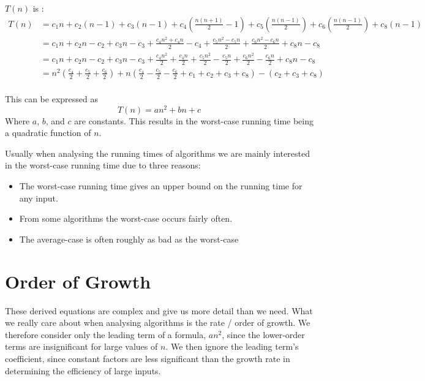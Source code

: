 \documentclass[12pt letter]{report}
\begin{document}
$T \left( n \right) $ is :
\begin{align*}
  T \left( n \right) & = c_1 n + c_2  \left( n - 1 \right) + c_3 \left( n-1 \right) + c_4 \left( \frac{n \left( n + 1
      \right) }{2} -1 \right)  +
  c_5 \left( \frac{n \left( n - 1 \right) }{2} \right)  + c_6 \left( \frac{n \left( n - 1 \right) }{2} \right) + c_8
  \left( n-1 \right)                                                                                                  \\
                     & = c_1n + c_2n -c_2 + c_3n - c_3 + \frac{c_4n^{2} + c_4n}{2} -c_4 + \frac{c_5 n^2 - c_5n}{2} +
  \frac{c_6 n^2 - c_6n}{2} + c_8n - c_8                                                                               \\
                     & =  c_1n + c_2n -c_2 + c_3n - c_3 + \frac{c_4 n^2}{2} + \frac{c_4n}{2} + \frac{c_5n^2}{2} -
  \frac{c_5n}{2} + \frac{c_6n^2}{2} - \frac{c_6n}{2} + c_8n - c_8                                                     \\
                     & = n^2 \left( \frac{c_4}{2} + \frac{c_5}{2}+ \frac{c_6}{2} \right) + n \left( \frac{c_4}{2}
  -\frac{c_5}{2}
  -\frac{c_6}{2} + c_1 + c_2 + c_3 + c_8 \right) - \left( c_2 + c_3 + c_8 \right)                                     \\
\end{align*}

This can be expressed as
\[
  T \left( n \right)  = an^2 + bn + c
\]
Where $a$, $b$, and $c$ are constants. This results in the worst-case running time being a quadratic function of $n$.

Usually when analysing the running times of algorithms we are mainly interested in the worst-case running time due to
three reasons:
\begin{itemize}
  \item The worst-case running time gives an upper bound on the running time for any input.
  \item From some algorithms the worst-case occurs fairly often.
  \item The average-case is often roughly as bad as the worst-case
\end{itemize}

\section{Order of Growth}

These derived equations are complex and give us more detail than we need. What we really care about when analysing
algorithms is the rate / order of growth. We therefore consider only the leading term of a formula, $an^2$, since the
lower-order terms are insignificant for large values of $n$. We then ignore the leading term's coefficient, since
constant factors are less significant than the growth rate in determining the efficiency of large inputs.
\end{document}

